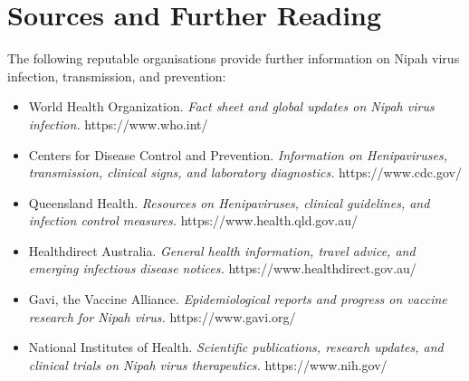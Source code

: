 \section*{Sources and Further Reading}
The following reputable organisations provide further information on Nipah virus infection, transmission, and prevention:
\begin{itemize}
    \item World Health Organization. \textit{Fact sheet and global updates on Nipah virus infection.} https://www.who.int/
    \item Centers for Disease Control and Prevention. \textit{Information on Henipaviruses, transmission, clinical signs, and laboratory diagnostics.} https://www.cdc.gov/
    \item Queensland Health. \textit{Resources on Henipaviruses, clinical guidelines, and infection control measures.} https://www.health.qld.gov.au/
    \item Healthdirect Australia. \textit{General health information, travel advice, and emerging infectious disease notices.} https://www.healthdirect.gov.au/
    \item Gavi, the Vaccine Alliance. \textit{Epidemiological reports and progress on vaccine research for Nipah virus.} https://www.gavi.org/
    \item National Institutes of Health. \textit{Scientific publications, research updates, and clinical trials on Nipah virus therapeutics.} https://www.nih.gov/
\end{itemize}
